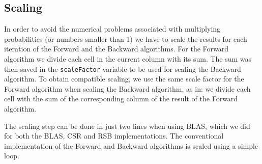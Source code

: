 \subsection{Scaling}
In order to avoid the numerical problems associated with multiplying probabilities (or numbers smaller than 1) we have to scale the results for each iteration of the Forward and the Backward algorithms. For the Forward algorithm we divide each cell in the current column with its sum. The sum was then saved in the \texttt{scaleFactor} variable to be used for scaling the Backward algorithm. To obtain compatible scaling, we use the same scale factor for the Forward algorithm when scaling the Backward algorithm, as in: we divide each cell with the sum of the corresponding column of the result of the Forward algorithm. 

The scaling step can be done in just two lines when using BLAS, which we did for both the BLAS, CSR and RSB implementations. The conventional implementation of the Forward and Backward algorithms is scaled using a simple loop.
